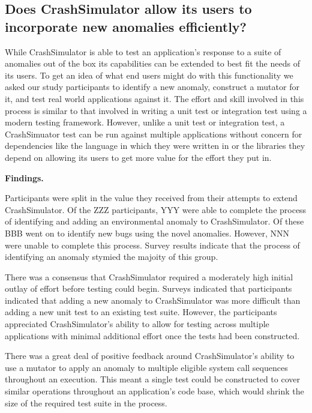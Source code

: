 \subsection{Does CrashSimulator allow its users to incorporate new
anomalies efficiently?}

While CrashSimulator is able to test an application's response to a suite
of anomalies out of the box its capabilities can be extended to best fit
the needs of its users.  To get an idea of what end users might do with
this functionality we asked our study participants to identify a new
anomaly, construct a mutator for it, and test real world applications
against it.
The effort and skill involved in
this process is similar to that involved in writing a unit test or
integration test using a modern testing framework.  However, unlike a unit
test or integration test, a CrashSimuator test can be run
against multiple
applications without concern for dependencies like the language in which
they were
written in or the libraries they depend on allowing its users to get more
value for the effort they put in.


{\bf Findings. }

Participants were split in the value they received
from their attempts to extend
CrashSimulator.  Of the ZZZ participants, YYY were able to complete the
process of identifying and adding an environmental anomaly to
CrashSimulator.  Of these BBB went on to identify new bugs using the novel
anomalies.  However, NNN were unable to complete this process.  Survey
results indicate that the process of identifying an anomaly stymied the
majoity of this group.

There was a consensus that
CrashSimulator required a
moderately high initial outlay of effort before testing could begin.
Surveys indicated that participants indicated that
adding a new anomaly to
CrashSimulator was more difficult than adding a new unit test to an
existing test suite.
However, the participants
appreciated
CrashSimulator's ability to allow for
testing
across multiple applications
with minimal additional effort once the tests had been constructed.

There was a great deal of
positive feedback around CrashSimulator's ability to use a mutator to apply
an anomaly to multiple eligible system call sequences throughout an
execution.  This meant a single test could be constructed to cover similar
operations throughout an application's code base, which would
shrink the size of the
required test suite in the process.


